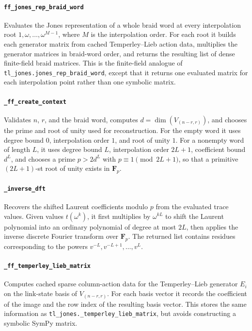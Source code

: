 \documentclass[10pt]{article}
\newcommand{\FF}{\mathbf{F}}
\begin{document}
\paragraph{\texttt{ff\_jones\_rep\_braid\_word}}
Evaluates the Jones representation of a whole braid word at every interpolation root \(1,\omega,\ldots,\omega^{M-1}\), where \(M\) is the interpolation order.
For each root it builds each generator matrix from cached Temperley--Lieb action data, multiplies the generator matrices in braid-word order, and returns the resulting list of dense finite-field braid matrices.
This is the finite-field analogue of \texttt{tl\_jones.jones\_rep\_braid\_word}, except that it returns one evaluated matrix for each interpolation point rather than one symbolic matrix.

\paragraph{\texttt{\_ff\_create\_context}}
Validates \(n\), \(r\), and the braid word, computes \(d=\dim(V_{(n-r,r)})\), and chooses the prime and root of unity used for reconstruction.
For the empty word it uses degree bound \(0\), interpolation order \(1\), and root of unity \(1\).
For a nonempty word of length \(L\), it uses degree bound \(L\), interpolation order \(2L+1\), coefficient bound \(d^L\), and chooses a prime \(p>2d^L\) with \(p\equiv 1 \pmod{2L+1}\), so that a primitive \((2L+1)\)-st root of unity exists in \(\FF_p\).

\paragraph{\texttt{\_inverse\_dft}}
Recovers the shifted Laurent coefficients modulo \(p\) from the evaluated trace values.
Given values \(t(\omega^k)\), it first multiplies by \(\omega^{kL}\) to shift the Laurent polynomial into an ordinary polynomial of degree at most \(2L\), then applies the inverse discrete Fourier transform over \(\FF_p\).
The returned list contains residues corresponding to the powers \(v^{-L},v^{-L+1},\ldots,v^L\).

\paragraph{\texttt{\_ff\_temperley\_lieb\_matrix}}
Computes cached sparse column-action data for the Temperley--Lieb generator \(E_i\) on the link-state basis of \(V_{(n-r,r)}\).
For each basis vector it records the coefficient of the image and the row index of the resulting basis vector.
This stores the same information as \texttt{tl\_jones.\_temperley\_lieb\_matrix}, but avoids constructing a symbolic SymPy matrix.
\end{document}
